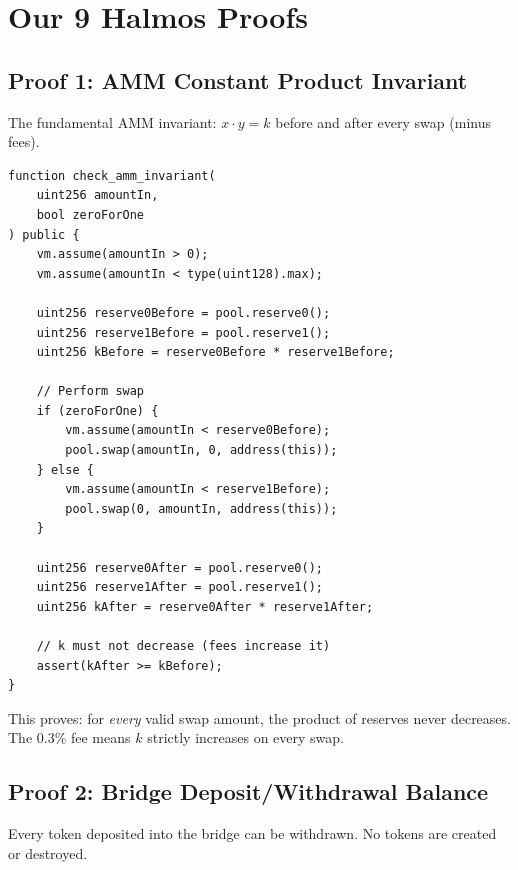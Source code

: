 \section{Our 9 Halmos Proofs}


\subsection{Proof 1: AMM Constant Product Invariant}

The fundamental AMM invariant: $x \cdot y = k$ before and after every swap (minus fees).

\begin{lstlisting}[language=Solidity,caption={AMM constant product proof}]
function check_amm_invariant(
    uint256 amountIn,
    bool zeroForOne
) public {
    vm.assume(amountIn > 0);
    vm.assume(amountIn < type(uint128).max);

    uint256 reserve0Before = pool.reserve0();
    uint256 reserve1Before = pool.reserve1();
    uint256 kBefore = reserve0Before * reserve1Before;

    // Perform swap
    if (zeroForOne) {
        vm.assume(amountIn < reserve0Before);
        pool.swap(amountIn, 0, address(this));
    } else {
        vm.assume(amountIn < reserve1Before);
        pool.swap(0, amountIn, address(this));
    }

    uint256 reserve0After = pool.reserve0();
    uint256 reserve1After = pool.reserve1();
    uint256 kAfter = reserve0After * reserve1After;

    // k must not decrease (fees increase it)
    assert(kAfter >= kBefore);
}
\end{lstlisting}

This proves: for \emph{every} valid swap amount, the product of reserves never decreases.
The 0.3\% fee means $k$ strictly increases on every swap.

\subsection{Proof 2: Bridge Deposit/Withdrawal Balance}

Every token deposited into the bridge can be withdrawn. No tokens are created or destroyed.

